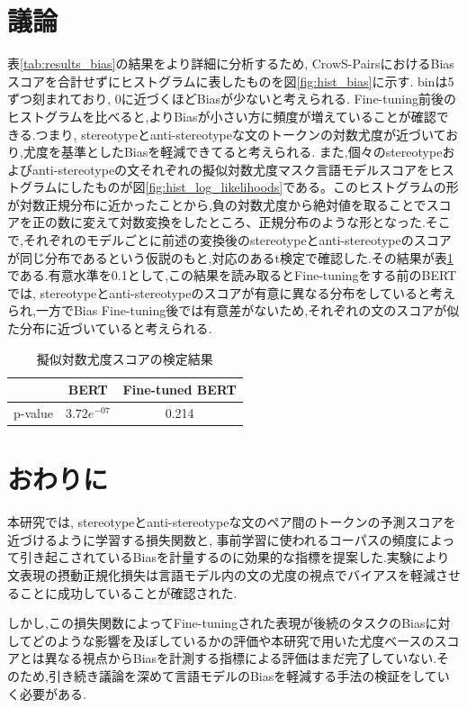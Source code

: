 \documentclass[
  platex, dvipdfmx %
]{nlp2021}
\begin{document}
\section{議論}
表\ref{tab:results_bias}の結果をより詳細に分析するため, CrowS-PairsにおけるBiasスコアを合計せずにヒストグラムに表したものを図\ref{fig:hist_bias}に示す. binは5ずつ刻まれており, 0に近づくほどBiasが少ないと考えられる. Fine-tuning前後のヒストグラムを比べると,よりBiasが小さい方に頻度が増えていることが確認できる.つまり, stereotypeとanti-stereotypeな文のトークンの対数尤度が近づいており,尤度を基準としたBiasを軽減できてると考えられる.
また,個々のstereotypeおよびanti-stereotypeの文それぞれの擬似対数尤度マスク言語モデルスコアをヒストグラムにしたものが図\ref{fig:hist_log_likelihoods}である。このヒストグラムの形が対数正規分布に近かったことから,負の対数尤度から絶対値を取ることでスコアを正の数に変えて対数変換をしたところ、正規分布のような形となった.そこで,それぞれのモデルごとに前述の変換後のstereotypeとanti-stereotypeのスコアが同じ分布であるという仮説のもと,対応のあるt検定で確認した.その結果が表\ref{tab:t_bias_scores}である.有意水準を0.1として,この結果を読み取るとFine-tuningをする前のBERTでは, stereotypeとanti-stereotypeのスコアが有意に異なる分布をしていると考えられ,一方でBias Fine-tuning後では有意差がないため,それぞれの文のスコアが似た分布に近づいていると考えられる.

\begin{table}[h]
\centering
\begin{tabular}{lcc}
\hline
 &  BERT & Fine-tuned BERT \\
\hline
p-value & $3.72e^{-07}$ &  0.214 \\
\hline
\end{tabular}
\caption{擬似対数尤度スコアの検定結果}
\label{tab:t_bias_scores}
\end{table}

\section{おわりに}
本研究では, stereotypeとanti-stereotypeな文のペア間のトークンの予測スコアを近づけるように学習する損失関数と, 事前学習に使われるコーパスの頻度によって引き起こされているBiasを計量するのに効果的な指標を提案した.実験により文表現の摂動正規化損失は言語モデル内の文の尤度の視点でバイアスを軽減させることに成功していることが確認された.

しかし,この損失関数によってFine-tuningされた表現が後続のタスクのBiasに対してどのような影響を及ぼしているかの評価や本研究で用いた尤度ベースのスコアとは異なる視点からBiasを計測する指標による評価はまだ完了していない.そのため,引き続き議論を深めて言語モデルのBiasを軽減する手法の検証をしていく必要がある.

\clearpage




\end{document}
